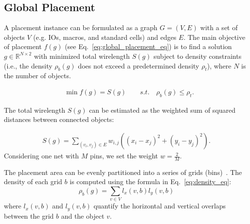 \subsection{Global Placement}

A placement instance can be formulated as a graph $G=(V, E)$ with a set of objects $V$ (e.g. IOs, macros, and standard cells) and edges $E$.
The main objective of placement $f(g)$ (see Eq.~\ref{eq:global_placement_eq}) is to find a solution $g \in \mathbb{R}^{N \times 2} $ with minimized total wirelength $S(g)$ subject to density constraints (i.e., the density $\rho_b(g)$ does not exceed a predetermined density $\rho_t$), where $N$ is the number of objects.

\begin{equation}\label{eq:global_placement_eq}
\begin{aligned}
&\min f(g) = S(g) \quad\quad s.t. \quad \rho_b(g) \leq \rho_t. 
\end{aligned}
\end{equation}

The total wirelength $S(g)$ can be estimated as the weighted sum of squared distances between connected objects:

\begin{equation}\label{eq:wire_eq}
\begin{aligned}
S(g) = \sum_{(v_i,v_j)\in E} w_{i,j}((x_i- x_j)^2 + (y_i- y_j)^2).
\end{aligned}
\end{equation}
Considering one net with $M$ pins, we set the weight $w = \frac{2}{M}$.  


The placement area can be evenly partitioned into a series of grids (bins)~\cite{2015eplace}. The density of each grid $b$ is computed using the formula in Eq.~\ref{eq:density_eq}:
\begin{equation}\label{eq:density_eq}
\rho_b(g) = \sum_{v \in V} l_x(v, b)l_y(v, b)
\end{equation}
where $l_x(v, b)$ and $l_y(v, b)$ quantify the horizontal and vertical overlaps between the grid $b$ and the object $v$.




